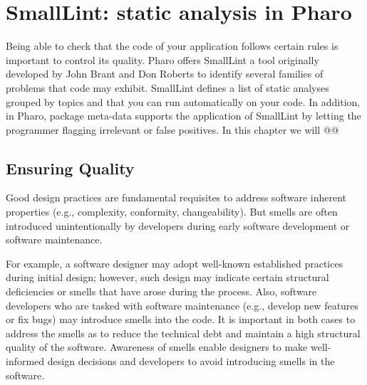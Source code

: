 \documentclass[a4paper,10pt,twoside]{book}
\begin{document}
	\sloppy
\fi



\chapter{SmallLint: static analysis in Pharo}


Being able to check that the code of your application follows certain rules is important to control its quality. Pharo offers SmallLint a tool originally developed by John Brant and Don Roberts to identify several families of problems that code may exhibit. SmallLint defines a list of static analyses grouped by topics and that you can run automatically on your code. In addition, in Pharo, package meta-data supports the application of SmallLint by letting the programmer flagging irrelevant or false positives. 
In this chapter we will @@





\section{Ensuring Quality}

Good design practices are fundamental requisites to address software inherent properties (e.g., complexity, conformity, changeability). But smells are often introduced unintentionally by developers during early software development or software maintenance.

For example, a software designer may adopt well-known established practices during initial design; however, such design may indicate certain structural deficiencies or smells that have arose during the process. 
Also, software developers who are tasked with software maintenance (e.g., develop new features or fix bugs) may introduce smells into the code.  It is important in both cases to address the smells as to reduce the technical debt and maintain a high structural quality of the software.
Awareness of smells enable designers to make well-informed design decisions and developers to avoid introducing smells in the software. 
\end{document}
